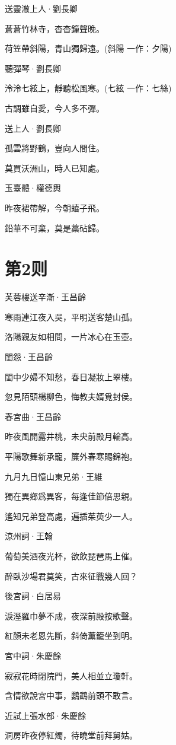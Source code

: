 \documentclass[12pt,a4paper]{ctexbook}
\begin{document}
送靈澈上人·劉長卿\par
蒼蒼竹林寺，杳杳鐘聲晚。\par
荷笠帶斜陽，青山獨歸遠。(斜陽 一作：夕陽)\par
聽彈琴·劉長卿\par
泠泠七絃上，靜聽松風寒。(七絃 一作：七絲)\par
古調雖自愛，今人多不彈。\par
送上人·劉長卿\par
孤雲將野鶴，豈向人間住。\par
莫買沃洲山，時人已知處。\par
玉臺體·權德輿\par
昨夜裙帶解，今朝蟢子飛。\par
鉛華不可棄，莫是藁砧歸。\par

\section{第2则}
芙蓉樓送辛漸·王昌齡\par
寒雨連江夜入吳，平明送客楚山孤。\par
洛陽親友如相問，一片冰心在玉壺。\par
閨怨·王昌齡\par
閨中少婦不知愁，春日凝妝上翠樓。\par
忽見陌頭楊柳色，悔教夫婿覓封侯。\par
春宮曲·王昌齡\par
昨夜風開露井桃，未央前殿月輪高。\par
平陽歌舞新承寵，簾外春寒賜錦袍。\par
九月九日憶山東兄弟·王維\par
獨在異鄉爲異客，每逢佳節倍思親。\par
遙知兄弟登高處，遍插茱萸少一人。\par
涼州詞·王翰\par
葡萄美酒夜光杯，欲飲琵琶馬上催。\par
醉臥沙場君莫笑，古來征戰幾人回？\par
後宮詞·白居易\par
淚溼羅巾夢不成，夜深前殿按歌聲。\par
紅顏未老恩先斷，斜倚薰籠坐到明。\par
宮中詞·朱慶餘\par
寂寂花時閉院門，美人相並立瓊軒。\par
含情欲說宮中事，鸚鵡前頭不敢言。\par
近試上張水部·朱慶餘\par
洞房昨夜停紅燭，待曉堂前拜舅姑。\par
\end{document}
